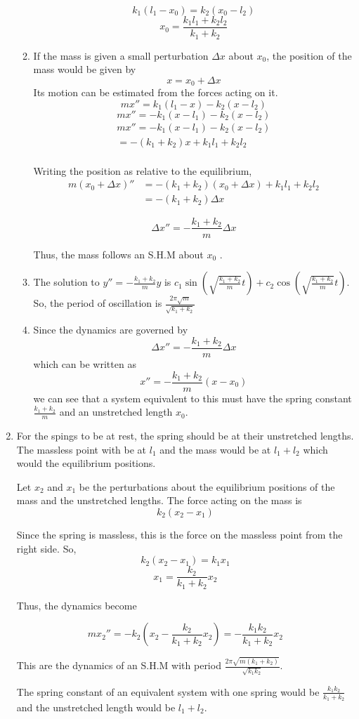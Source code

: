 \documentclass[letterpaper,12pt]{article}
\begin{document}
\begin{enumerate}
\begin{enumerate}
\[ k_1(l_1-x_0)=k_2(x_0-l_2)\]
\[x_0 = \frac{k_1 l_1 + k_2 l_2}{k_1 + k_2} \]

\item
If the mass is given a small perturbation $\Delta x$ about $x_0$, the position of the mass would be given by
\[x = x_0 + \Delta x\]
Its motion can be estimated from the forces acting on it.
\[mx'' =k_1(l_1-x) -k_2(x-l_2)\]
\[mx'' = -k_1(x-l_1) -k_2(x-l_2)\]
\begin{align*}
mx''  = -k_1(x-l_1) -k_2(x-l_2) \\
 = -(k_1+k_2)x +k_1 l_1 + k_2 l_2\\
\end{align*}

Writing the position as relative to the equilibrium,
\begin{align*}
m(x_0+\Delta x)''
 &= -(k_1+k_2)(x_0+\Delta x) +k_1 l_1 + k_2 l_2\\
 &= -(k_1+k_2)\Delta x
\end{align*}

\[\Delta x'' = -\frac{k_1+k_2}{m}\Delta x\]

Thus, the mass follows an S.H.M about $x_0$ .

\item

The solution to $y'' = -\frac{k_1+k_2}{m}y$ is $c_1 \sin(\sqrt{\frac{k_1+k_2}{m}}t)+ c_2 \cos(\sqrt{\frac{k_1+k_2}{m}}t)$. So, the period of oscillation is $\frac{2 \pi\sqrt{m}}{\sqrt{k_1+k_2}}$

\item

Since the dynamics are governed by
\[\Delta x'' = -\frac{k_1+k_2}{m}\Delta x\]
which can be written as
\[ x'' = -\frac{k_1+k_2}{m}(x-x_0)\]
we can see that a system equivalent to this must have the spring constant $\frac{k_1+k_2}{m}$ and an unstretched length $x_0$.


\end{enumerate}
\item
For the spings to be at rest, the spring should be at their unstretched lengths. The massless point with be at $l_1$ and the mass would be at $l_1 + l_2$ which would the equilibrium positions.


Let $x_2$ and $x_1$ be the perturbations about the equilibrium positions of the mass and the unstretched lengths.   The force acting on the mass is
\[k_2(x_2-x_1)\]

Since the spring is massless, this is the force on the massless point from the right side.
So,
\[k_2(x_2-x_1)= k_1 x_1\]
\[x_1 =\frac{k_2}{k_1 +k_2}x_2\]

Thus, the dynamics become

\[m x_2'' =- k_2(x_2-\frac{k_2}{k_1 +k_2} x_2)= -\frac{k_1 k_2}{k_1 +k_2}x_2\]

This are the dynamics of an S.H.M with period $\frac{2 \pi \sqrt{m(k_1+k_2)}}{\sqrt{k_1k_2}}$.

The spring constant of an equivalent system with one spring would be $\frac{k_1 k_2}{k_1 +k_2}$ and the unstretched length would be $l_1 +l_2$.
\end{enumerate}
\end{document}
